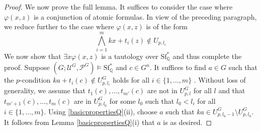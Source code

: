 \documentclass[letterpaper]{amsart}
\newcommand{\qq}{\mathbb{Q}}
\newcommand{\zz}{\mathbb{Z}}
\newcommand{\sU}{\mathscr{U}}
\newcommand{\sP}{\mathscr{P}}
\newcommand{\WSFQ}{\mathrm{Sf}^*_{\qq}}
\begin{document}
\begin{proof}
We now prove the full lemma. It suffices to consider the case where $\varphi(x,z)$ is a conjunction of atomic formulas. In view of the preceding paragraph, we reduce further to the case where $\varphi(x,z)$ is of the form 
$$ \bigwedge_{i=1}^m kx+t_i(z) \notin U_{p,l_i}  $$
We now show that $\exists x\varphi(x,z)$ is a tautology over $\WSFQ$ and thus complete the proof. Suppose $(G; \sU^G, \sP^G) \models \WSFQ $ and $c \in G^n$. It suffices to find $a \in G$ such that the $p$-condition  $ka+t_i(c) \notin U^G_{p,l_i}$ holds for all $i \in \{1, \ldots, m\}$ . Without loss of generality, we assume that $t_1(c), \ldots, t_{m'}(c)$ are not in $U^G_{p,l}$ for all $l$ and that  $t_{m'+1}(c), \ldots, t_{m}(c)$ are in $U^G_{p,l_0}$ for some $l_0 $ such that $l_0 < l_i$ for all $i \in \{1, \ldots, m\}$. Using \ref{basicpropertiesQ}(ii), choose $a$ such that $ka \in U^G_{p,l_0-1} \setminus  U^G_{p,l_0}$. It follows from Lemma \ref{basicpropertiesQ}(i) that $a$ is as desired. 
\begin{comment}
Suppose $\varphi \in L(x)$ is a $p$-formula. We need to show that $\neg \varphi$ is also a $p$-formula.  It suffices to show the statement in the case where $\varphi$ is a primitive $p$-formula as in the above definition. Then in an arbitrary $(G; 1, P) \models T^{-}_1$, 
$$  \neg \varphi(a) \ \text{ if and only if }\  \bigvee_{i =1}^{p^l} \left(k \cdot a \equiv_{p^l}  r+i \right) \quad \text{for all } a \in G^m,  $$
which can clearly be expressed by a $p$-formula.

Let $\varphi\in L(x, y)$ be a $p$-formula with $|y|=1$. It remains to show that $\exists y \varphi$ is also a $p$-formula. We can arrange that $\varphi$ is a boolean combinations of  primitive $p$-formulas of type $l$. Choose  $(G; 1, P) \models T^{-}_1$. Then for all $a \in G^m$ and $b, b' \in G$ such that $b \equiv_{p^l} b'$, $\varphi(a,b)$  if and only if $\varphi(a,b')$.  For all $a \in G^m$, let $\overline{a}$ be the its image in $G \slash (p^lG)$.  Then for all $a \in G^m$,
$$k\cdot a  \equiv_{p^l}  r \ \text{ if and only if }\  k\cdot \overline{a} = \bar{r} \text{ holds in } G\slash (p^lG). $$
 The preceding two remarks allows us to obtain a formula $\overline{\varphi} \in L(x, y)$ such that for all $a \in G^m$ and $b \in G$,
$$ \varphi(a, b) \  \text{ if and only if }\  \overline{\varphi}(\overline{a}, \overline{b}) \text{ holds in } G\slash (p^lG)  $$ 
and 
$$ \exists y\varphi(a, y) \  \text{ if and only if }\  \exists y \overline{\varphi}(\overline{a}, y) \text{ holds in } G\slash (p^lG).  $$ 
Using the fact that $G\slash (p^lG)$ is a finite group generated by $\bar{1}$, we acquire a finite subset  $\Delta$ of $\{ 0, \ldots, p^l-1\}^m$ such that 
$$ \exists y \overline{\varphi}(\overline{a}, y) \text{ if and only if } \bigvee_{r \in \Delta} \bigwedge_{i=1}^m (a_i = \overline{r}_i) \text{ holds in } G\slash (p^lG). $$
The latter can clearly be expressed by a $p$ formula $\psi \in L(x)$. Finally, we note that   $(G \slash (p^lG); \bar{1})$ can be canonically identified with $(\zz \slash (p^l \zz); \bar{1})$.  Hence, the formula $\psi$ as above can be obtained independently from the choice of $(G; 1, P)$. The desired conclusion follows.
\end{comment}
\end{proof}
\end{document}
